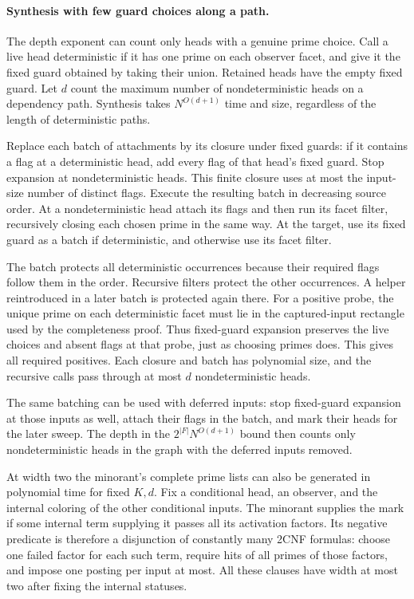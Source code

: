\paragraph{Synthesis with few guard choices along a path.}
The depth exponent can count only heads
with a genuine prime choice. Call a live
head deterministic if it has one prime
on each observer facet, and give it the
fixed guard obtained by taking their
union. Retained heads have the empty
fixed guard. Let $d$ count the maximum
number of nondeterministic heads on a
dependency path. Synthesis takes
$N^{O(d+1)}$ time and size, regardless
of the length of deterministic paths.

Replace each batch of attachments by
its closure under fixed guards: if it
contains a flag at a deterministic
head, add every flag of that head's
fixed guard. Stop expansion at
nondeterministic heads. This finite
closure uses at most the input-size
number of distinct flags. Execute
the resulting batch in decreasing
source order. At a nondeterministic
head attach its flags and then run its
facet filter, recursively closing
each chosen prime in the same way.
At the target, use its fixed guard
as a batch if deterministic, and
otherwise use its facet filter.

The batch protects all deterministic
occurrences because their required
flags follow them in the order.
Recursive filters protect the other
occurrences. A helper reintroduced
in a later batch is protected again
there. For a positive probe, the
unique prime on each deterministic
facet must lie in the captured-input
rectangle used by the completeness
proof. Thus fixed-guard expansion
preserves the live choices and
absent flags at that probe, just as
choosing primes does. This gives
all required positives. Each closure
and batch has polynomial size, and
the recursive calls pass through at
most $d$ nondeterministic heads.

The same batching can be used with
deferred inputs: stop fixed-guard
expansion at those inputs as well,
attach their flags in the batch,
and mark their heads for the later
sweep. The depth in the
$2^{|F|}N^{O(d+1)}$ bound then counts
only nondeterministic heads in the
graph with the deferred inputs
removed.

At width two the minorant's complete prime lists
can also be generated in polynomial time for fixed
$K,d$. Fix a conditional head, an observer, and
the internal coloring of the other conditional
inputs. The minorant supplies the mark if some
internal term supplying it passes all its
activation factors. Its negative predicate is
therefore a disjunction of constantly many
2CNF formulas: choose one failed factor for
each such term, require hits of all primes of
those factors, and impose one posting per
input at most. All these clauses have width
at most two after fixing the internal statuses.

